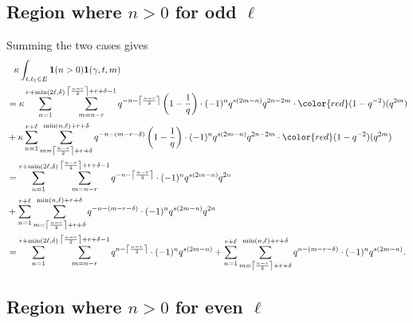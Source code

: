 \subsection{Region where $n > 0$ for odd $\ell$}
Summing the two cases gives
\begin{align*}
  &\phantom=
    \kappa \int_{t, t_1 \in E} \mathbf{1}(n > 0) \mathbf{1}(\gamma,t,m) \\
  &= \kappa \sum_{n=1}^{r+\min(2\ell,\delta)}
    \sum_{m=n-r}^{\left\lceil \frac{n-r}{2} \right\rceil+r+\delta-1}
    q^{-n - \left\lceil \frac{n-r}{2} \right\rceil} \left( 1 - \frac 1q \right)
    \cdot (-1)^n q^{s(2m-n)} q^{2n-2m}
    \cdot {\color{red} (1-q^{-2})(q^{2m})}
    \\
  &+ \kappa \sum_{n=1}^{r+\ell}
    \sum_{m=\left\lceil \frac{n-r}{2} \right\rceil+r+\delta}^{\min(n,\ell)+r+\delta}
    q^{-n - (m-r-\delta)} \left( 1 - \frac 1q \right) \cdot (-1)^n q^{s(2m-n)} q^{2n-2m}
    \cdot {\color{red} (1-q^{-2})(q^{2m})}
    \\
  &= \sum_{n=1}^{r+\min(2\ell,\delta)}
    \sum_{m=n-r}^{\left\lceil \frac{n-r}{2} \right\rceil+r+\delta-1}
    q^{-n - \left\lceil \frac{n-r}{2} \right\rceil} \cdot (-1)^n q^{s(2m-n)} q^{2n}
    \\
  &+ \sum_{n=1}^{r+\ell}
    \sum_{m=\left\lceil \frac{n-r}{2} \right\rceil+r+\delta}^{\min(n,\ell)+r+\delta}
    q^{-n - (m-r-\delta)} \cdot (-1)^n q^{s(2m-n)} q^{2n}
    \\
  &= \sum_{n=1}^{r+\min(2\ell,\delta)}
    \sum_{m=n-r}^{\left\lceil \frac{n-r}{2} \right\rceil+r+\delta-1}
    q^{n - \left\lceil \frac{n-r}{2} \right\rceil} \cdot (-1)^n q^{s(2m-n)}
  + \sum_{n=1}^{r+\ell}
    \sum_{m=\left\lceil \frac{n-r}{2} \right\rceil+r+\delta}^{\min(n,\ell)+r+\delta}
    q^{n - (m-r-\delta)} \cdot (-1)^n q^{s(2m-n)}
  .
\end{align*}

\subsection{Region where $n > 0$ for even $\ell$}
